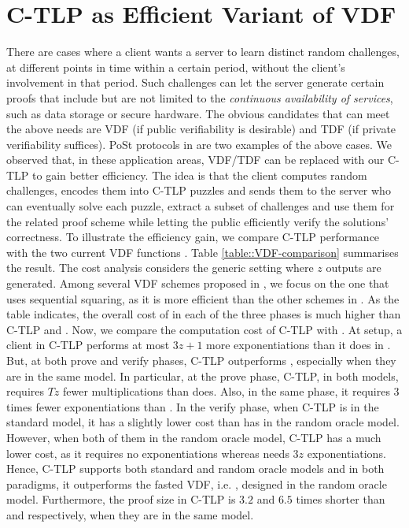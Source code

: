 \vspace{-6mm}
\section{C-TLP as Efficient Variant of VDF}\label{section::Variant-of-VDF}




There are cases where a client wants a server to learn distinct random challenges, at different points in time within a certain period, without the client's involvement in that period. Such challenges can let the server generate certain proofs that include but are not limited to the \emph{continuous availability of services}, such as data storage or secure hardware. The obvious candidates that can meet the above needs are VDF (if  public verifiability is desirable) and TDF (if   private verifiability suffices). PoSt protocols  in \cite{Storage-Time} are two examples of the above cases. We observed that, in these application areas, VDF/TDF can be replaced with our C-TLP to gain better efficiency. The idea is that the client computes random challenges, encodes them into C-TLP puzzles and sends them to the server who can eventually solve each puzzle, extract a subset of challenges and use them for the related proof scheme while letting the public efficiently verify the solutions' correctness. To illustrate the efficiency gain,  we compare C-TLP performance with the two current VDF functions \cite{Wesolowski19,BonehBBF18}. Table \ref{table::VDF-comparison} summarises the result. The cost analysis considers the generic setting where $z$ outputs are generated. Among several VDF schemes proposed in \cite{BonehBBF18}, we focus on the one that uses sequential squaring, as it is more efficient than the other schemes in \cite{BonehBBF18}.   As the table indicates, the overall cost of \cite{BonehBBF18} in each of the three phases is much higher than C-TLP and \cite{Wesolowski19}. Now, we compare the computation cost of C-TLP  with  \cite{Wesolowski19}.  At setup, a client  in C-TLP  performs at most $3z+1$ more exponentiations than it does in \cite{Wesolowski19}. But, at both prove and verify phases, C-TLP   outperforms \cite{BonehBBF18}, especially when they are in the same model. In particular,  at the prove phase, C-TLP, in both models,  requires $Tz$ fewer multiplications than  \cite{Wesolowski19} does. Also, in the same phase, it requires $3$ times fewer exponentiations than \cite{Wesolowski19}. In the verify phase,  when C-TLP is in the
standard model, it has a slightly lower cost than \cite{Wesolowski19} has in the random oracle model. However, when both of them in the random oracle model, C-TLP   has a much lower cost, as it requires no exponentiations whereas  \cite{Wesolowski19} needs $3z$ exponentiations.  Hence,  C-TLP   supports both standard and random oracle models and in both paradigms, it outperforms the fasted VDF, i.e. \cite{Wesolowski19}, designed in the random oracle model. Furthermore, the  proof size in C-TLP  is $3.2$ and $6.5$ times shorter than \cite{BonehBBF18} and  \cite{Wesolowski19} respectively, when they are in the same model. 




